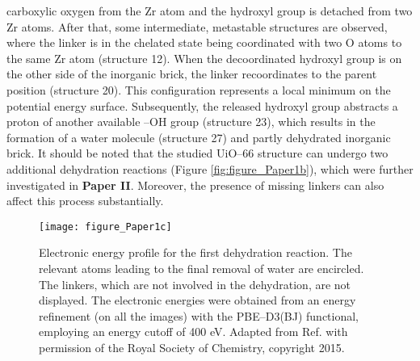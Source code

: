carboxylic oxygen from the Zr atom and the hydroxyl group is detached from two
Zr atoms. After that, some intermediate, metastable structures are observed,
where the linker is in the chelated state being coordinated with two O atoms
to the same Zr atom (structure 12). When the decoordinated hydroxyl
group is on the other side of the inorganic brick, the linker recoordinates to the parent position (structure 20). This configuration represents a local minimum on the potential energy surface. Subsequently, the released hydroxyl group abstracts a proton of another available 
--OH group (structure 23), which results in the formation of a
water molecule (structure 27) and partly dehydrated inorganic brick. It should
be noted that the studied UiO--66 structure can undergo two additional
dehydration reactions (Figure
\ref{fig:figure_Paper1b}), which were further investigated in \textbf{Paper II}.
Moreover, the presence of missing linkers can also affect this process
substantially.

\begin{figure}[!htp]
	\centering
	\texttt{[image: figure\_Paper1c]}
	\caption[Electronic energy profile for the first dehydration reaction.
The relevant atoms leading to the final removal of water are encircled.
The linkers, which are not involved in the dehydration, are not
displayed. The electronic energies were obtained from an energy
refinement (on all the images) with the PBE--D3(BJ) functional,
employing an energy cutoff of 400 eV.]{Electronic energy profile for the first dehydration reaction.
The relevant atoms leading to the final removal of water are encircled.
The linkers, which are not involved in the dehydration, are not
displayed. The electronic energies were obtained from an energy
refinement (on all the images) with the PBE--D3(BJ) functional,
employing an energy cutoff of 400 eV. Adapted from Ref.\cite{Vandichel2015} with
permission of the Royal Society of Chemistry, copyright 2015.}
	\label{fig:figure_Paper1c}
\end{figure}

\newpage
